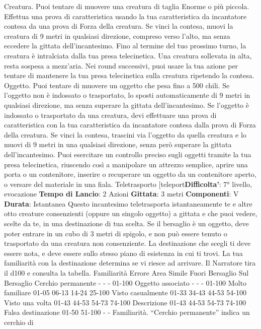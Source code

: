 \begin{multicols}{2}
Creatura. Puoi tentare di muovere una creatura di
taglia Enorme o più piccola. Effettua una prova di
caratteristica usando la tua caratteristica da incantatore
contesa da una prova di Forza della creatura. Se vinci
la contesa, muovi la creatura di 9 metri in qualsiasi
direzione, compreso verso l’alto, ma senza eccedere la
gittata dell’incantesimo. Fino al termine del tuo
prossimo turno, la creatura è intralciata dalla tua presa
telecinetica. Una creatura sollevata in alta, resta
sospesa a mezz’aria.
Nei round successivi, puoi usare la tua azione per
tentare di mantenere la tua presa telecinetica sulla
creatura ripetendo la contesa.
Oggetto. Puoi tentare di muovere un oggetto che pesa
fino a 500 chili. Se l’oggetto non è indossato o
trasportato, lo sposti automaticamente di 9 metri in
qualsiasi direzione, ma senza superare la gittata
dell’incantesimo.
Se l’oggetto è indossato o trasportato da una creatura,
devi effettuare una prova di caratteristica con la tua
caratteristica da incantatore contesa dalla prova di
Forza della creatura. Se vinci la contesa, trascini via
l’oggetto da quella creatura e lo muovi di 9 metri in una
qualsiasi direzione, senza però superare la gittata
dell’incantesimo.
Puoi esercitare un controllo preciso sugli oggetti tramite
la tua presa telecinetica, riuscendo così a manipolare
un attrezzo semplice, aprire una porta o un contenitore,
inserire o recuperare un oggetto da un contenitore
aperto, o versare del materiale in una fiala.
Teletrasporto
[teleport\textbf{Difficolta'}:
7° livello, evocazione
\textbf{Tempo di Lancio}: 2 Azioni
\textbf{Gittata}: 3 metri
\textbf{Componenti}: V
\textbf{Durata}: Istantanea
Questo incantesimo teletrasporta istantaneamente te e
altre otto creature consenzienti (oppure un singolo
oggetto) a gittata e che puoi vedere, scelte da te, in una
destinazione di tua scelta. Se il bersaglio è un oggetto,
deve poter entrare in un cubo di 3 metri di spigolo, e
non può essere tenuto o trasportato da una creatura
non consenziente.
La destinazione che scegli ti deve essere nota, e deve
essere sullo stesso piano di esistenza in cui ti trovi. La
tua familiarità con la destinazione determina se vi riesce
ad arrivare. Il Narratore tira il d100 e consulta la tabella.
Familiarità Errore Area
Simile
Fuori
Bersaglio
Sul
Bersaglio
Cerchio
permanente
- - - 01-100
Oggetto
associato
- - - 01-100
Molto
familiare
01-05 06-13 14-24 25-100
Visto
casualmente
01-33 34-43 44-53 54-100
Visto una
volta
01-43 44-53 54-73 74-100
Descrizione 01-43 44-53 54-73 74-100
Falsa
destinazione
01-50 51-100 - -
Familiarità. “Cerchio permanente” indica un cerchio di

\end{multicols}
